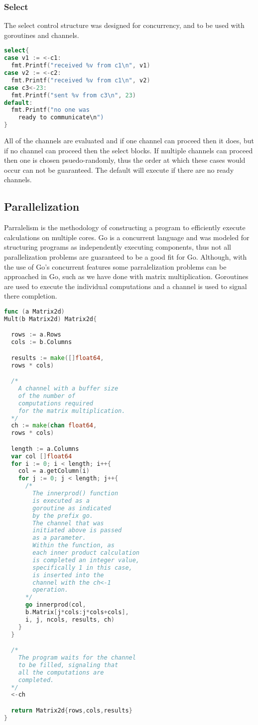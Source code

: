 \subsubsection{Select}
The select control structure was designed for concurrency, and to be used with goroutines and channels. 
\begin{lstlisting}[language=Go]
select{
case v1 := <-c1:
  fmt.Printf("received %v from c1\n", v1)
case v2 := <-c2:
  fmt.Printf("received %v from c1\n", v2)
case c3<-23:
  fmt.Printf("sent %v from c3\n", 23)
default:
  fmt.Printf("no one was 
    ready to communicate\n")
}
\end{lstlisting}
All of the channels are evaluated and if one channel can proceed then it does, but if no channel can proceed then the select blocks. If multiple channels can proceed then one is chosen psuedo-randomly, thus the order at which these cases would occur can not be guaranteed. The default will execute if there are no ready channels.\cite{video:go-concurr-patterns}
\subsection{Parallelization}
Parralelism is the methodology of constructing a program to efficiently execute calculations on multiple cores. Go is a concurrent language and was modeled for structuring programs as independently executing components, thus not all parallelization problems are guaranteed to be a good fit for Go. Although, with the use of Go's concurrent features some parralelization problems can be approached in Go, such as we have done with matrix multiplication. Goroutines are used to execute the individual computations and a channel is used to signal there completion. \cite{website:go-lang-documentation}
\begin{lstlisting}[language=Go]
func (a Matrix2d) 
Mult(b Matrix2d) Matrix2d{

  rows := a.Rows
  cols := b.Columns

  results := make([]float64,
  rows * cols)

  /*
    A channel with a buffer size
    of the number of 
    computations required
    for the matrix multiplication.
  */
  ch := make(chan float64,
  rows * cols)

  length := a.Columns
  var col []float64
  for i := 0; i < length; i++{
    col = a.getColumn(i)
    for j := 0; j < length; j++{
      /*
        The innerprod() function
        is executed as a
        goroutine as indicated
        by the prefix go.
        The channel that was
        initiated above is passed
        as a parameter.
        Within the function, as
        each inner product calculation
        is completed an integer value,
        specifically 1 in this case,
        is inserted into the 
        channel with the ch<-1
        operation. 
      */
      go innerprod(col,
      b.Matrix[j*cols:j*cols+cols],
      i, j, ncols, results, ch)
    }
  }

  /*
    The program waits for the channel
    to be filled, signaling that
    all the computations are
    completed.
  */
  <-ch

  return Matrix2d{rows,cols,results}
}
\end{lstlisting}


